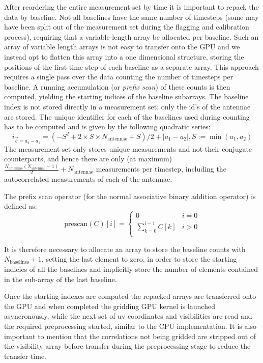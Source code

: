 After reordering the entire measurement set by time it is important to repack the data by baseline. 
Not all baselines have the same number of timesteps (some may have been split out of the measurement 
set during the flagging and calibration process), requiring that a variable-length array be allocated
per baseline. Such an array of variable length arrays is not easy to transfer onto the GPU and we instead
opt to flatten this array into a one dimensional structure, storing the positions of the first time step
of each baseline as a separate array. This approach requires a single pass over the data counting 
the number of timesteps per baseline. A running accumulation (or \textit{prefix scan}) of these counts
is then computed, yielding the starting indices of the baseline subarrays. The baseline index is not
stored directly in a measurement set: only the id's of the antennae are stored. The unique identifier
for each of the baselines used during counting has to be computed and is given by the following quadratic series:
\begin{equation}
 i_{\vec{b}=a_2-a_1} = (-S^2 + 2\times S\times N_\text{antennae} + S) / 2 + |a_1 - a_2|, S := \min(a_1,a_2)
\end{equation}
The measurement set only stores unique measurements and not their conjugate 
counterparts, and hence there are only (at maximum) $\frac{N_\text{antennae}(N_\text{antennae} - 1)}{2} + N_\text{antennae}$
measurements per timestep, including the autocorrelated measurements of each of the antennae.

The prefix scan operator (for the normal associative binary addition operator) is defined as:
\begin{equation}
 \text{prescan}(C)[i] = 
			\begin{cases}
			  0 & i = 0 \\
			  \sum_{k=0}^{i-1}{C[k]} & i > 0 \\
			\end{cases}
\end{equation}

It is therefore necessary to allocate an array to store the baseline counts with $N_\text{baselines} + 1$, setting the last element to zero,
in order to store the starting indicies of all the baselines and implicitly store the number of elements contained in the sub-array of the last
baseline.

Once the starting indexes are computed the repacked arrays are transferred onto the GPU and when completed the gridding GPU kernel is 
launched asyncronously, while the next set of uv coordinates and visibilities are read and the required preprocessing started, similar 
to the CPU implementation. It is also important to mention that the correlations not being gridded are stripped out of the visibility 
array before transfer during the preprocessing stage to reduce the transfer time.

